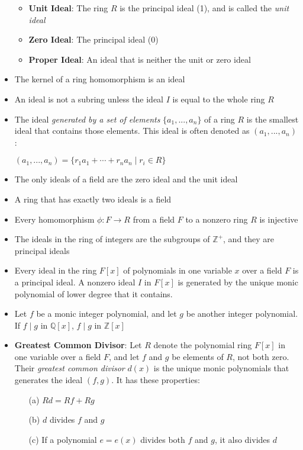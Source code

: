 \documentclass[12pt]{article}
\begin{document}
\begin{itemize}
\begin{itemize}
    \item \textbf{Unit Ideal}: The ring $R$ is the principal ideal (1), and is  called the \textit{unit ideal}
    \item \textbf{Zero Ideal}: The principal ideal (0)
    \item \textbf{Proper Ideal}: An ideal that is neither the unit or zero ideal
  \end{itemize}
  \item The kernel of a ring homomorphism is an ideal
  \item An ideal is not a subring unless the ideal $I$ is equal to the whole ring $R$
  \item The ideal \textit{generated by a set of elements} $\{a_1, ..., a_n\}$ of a ring $R$ is the smallest ideal that contains those elements. This ideal is often denoted as $(a_1, ..., a_n)$:
  \begin{center}
    $(a_1, ..., a_n) = \{r_1a_1 + \cdots + r_na_n \mid r_i \in R\}$
  \end{center}
  \item The only ideals of a field are the zero ideal and the unit ideal
  \item A ring that has exactly two ideals is a field
  \item Every homomorphism $\phi: F \to R$ from a field $F$ to a nonzero ring $R$ is injective
  \item The ideals in the ring of integers are the subgroups of $\mathbb{Z}^+$, and they are principal ideals
  \item Every ideal in the ring $F[x]$ of polynomials in one variable $x$ over a field $F$ is a principal ideal. A nonzero ideal $I$ in $F[x]$ is generated by the unique monic polynomial of lower degree that it contains.
  \item Let $f$ be a monic integer polynomial, and let $g$ be another integer polynomial. If $f\mid g$ in $\mathbb{Q}[x]$, $f\mid g$ in $\mathbb{Z}[x]$
  \item \textbf{Greatest Common Divisor}: Let $R$ denote the polynomial ring $F[x]$ in one variable over a field $F$, and let $f$ and $g$ be elements of $R$, not both zero. Their \textit{greatest common divisor} $d(x)$ is the unique monic polynomials that generates the ideal $(f,g)$. It has these properties:
  \begin{enumerate}
    \item[(a)] $Rd = Rf + Rg$
    \item[(b)] $d$ divides $f$ and $g$
    \item[(c)] If a polynomial $e = e(x)$ divides both $f$ and $g$, it also divides $d$

\end{enumerate}
\end{itemize}
\end{document}
